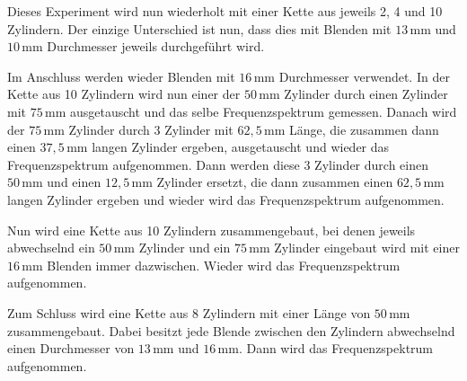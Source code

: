 Dieses Experiment wird nun wiederholt mit einer Kette aus jeweils 2, 4 und 10 Zylindern. Der einzige Unterschied ist nun, dass dies mit Blenden mit $13 \, \mathrm{mm}$ und $10 \, \mathrm{mm}$ Durchmesser jeweils durchgeführt wird. \newline

Im Anschluss werden wieder Blenden mit $16 \, \mathrm{mm}$ Durchmesser verwendet. In der Kette aus 10 Zylindern wird nun einer der $50 \, \mathrm{mm}$ Zylinder durch einen Zylinder mit $75 \, \mathrm{mm}$ ausgetauscht und das selbe Frequenzspektrum gemessen. Danach wird der $75 \, \mathrm{mm}$ Zylinder durch 3 Zylinder mit $62, \! 5 \, \mathrm{mm}$ Länge, die zusammen dann einen $37, \! 5 \, \mathrm{mm}$ langen Zylinder ergeben, ausgetauscht und wieder das Frequenzspektrum aufgenommen. Dann werden diese 3 Zylinder durch einen $50 \, \mathrm{mm}$ und einen $12, \! 5 \, \mathrm{mm}$ Zylinder ersetzt, die dann zusammen einen $62, \! 5 \, \mathrm{mm}$ langen Zylinder ergeben und wieder wird das Frequenzspektrum aufgenommen. \newline

Nun wird eine Kette aus 10 Zylindern zusammengebaut, bei denen jeweils abwechselnd ein $50 \, \mathrm{mm}$ Zylinder und ein $75 \, \mathrm{mm}$ Zylinder eingebaut wird mit einer $16 \, \mathrm{mm}$ Blenden immer dazwischen. Wieder wird das Frequenzspektrum aufgenommen. \newline

Zum Schluss wird eine Kette aus 8 Zylindern mit einer Länge von $50 \, \mathrm{mm}$ zusammengebaut. Dabei besitzt jede Blende zwischen den Zylindern abwechselnd einen Durchmesser von $13 \, \mathrm{mm}$ und $16 \, \mathrm{mm}$. Dann wird das Frequenzspektrum aufgenommen.
